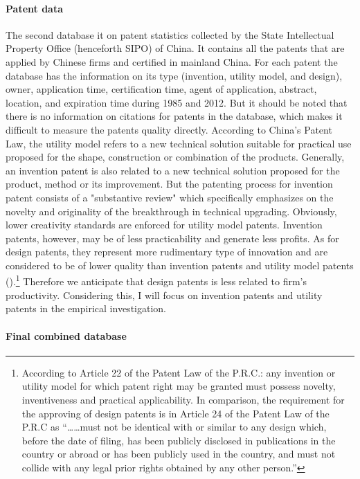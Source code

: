 \documentclass[English]{article}
\begin{document}
\paragraph{Patent data}
The second database it on patent statistics collected by the State
Intellectual Property Office (henceforth SIPO) of China. It contains
all the patents that are applied by Chinese firms and certified in mainland China. For each patent the database has the information on its type (invention, utility model, and design), owner, application
time, certification time, agent of application, abstract, location,
and expiration time during 1985 and 2012. But it should be noted that
there is no information on citations for patents in the database,
which makes it difficult to measure the patents quality directly. According to China's Patent Law, the utility model refers to a new technical solution suitable for practical use proposed for the shape, construction or combination of the products. Generally, an invention patent is also related to a new technical solution proposed for the product, method or its improvement. But the patenting process for invention patent consists of a "substantive review" which specifically emphasizes on the novelty and originality of the breakthrough in technical upgrading. Obviously, lower creativity standards are enforced for utility model patents. Invention patents, however, may be of less practicability and generate less profits. As for design patents, they represent more rudimentary type of innovation and are considered to be of lower quality than invention patents and utility model patents (\citet{hu2017china}).\footnote{ According to Article 22 of the Patent Law of the P.R.C.: any invention
or utility model for which patent right may be granted must possess
novelty, inventiveness and practical applicability. In comparison,
the requirement for the approving of design patents is in Article
24 of the Patent Law of the P.R.C as \textquotedblleft \dots \dots must
not be identical with or similar to any design which, before the date
of filing, has been publicly disclosed in publications in the country
or abroad or has been publicly used in the country, and must not collide
with any legal prior rights obtained by any other person.\textquotedblright{}}
 Therefore we anticipate that design patents is less related to firm's productivity. Considering this, I will focus on invention patents and utility patents in the empirical investigation. 

\paragraph{Final combined database}
\end{document}
